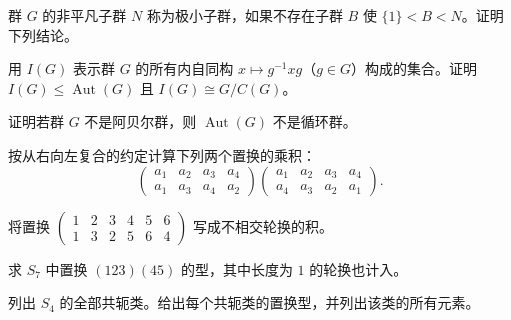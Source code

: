 \newpage
\noindent\begin{minipage}{\textwidth}
群 $G$ 的非平凡子群 $N$ 称为极小子群，如果不存在子群 $B$ 使 $\{1\}<B<N$。证明下列结论。
\end{minipage}\par\vfill
\noindent\begin{minipage}{\textwidth}
用 $I(G)$ 表示群 $G$ 的所有内自同构 $x\mapsto g^{-1}xg$（$g\in G$）构成的集合。证明 $I(G)\le\operatorname{Aut}(G)$ 且 $I(G)\cong G/C(G)$。
\end{minipage}\par\vfill
\noindent\begin{minipage}{\textwidth}
证明若群 $G$ 不是阿贝尔群，则 $\operatorname{Aut}(G)$ 不是循环群。
\end{minipage}\par\vfill
\newpage
\noindent\begin{minipage}{\textwidth}
按从右向左复合的约定计算下列两个置换的乘积：\[\begin{pmatrix}a_1&a_2&a_3&a_4\\a_1&a_3&a_4&a_2\end{pmatrix}\begin{pmatrix}a_1&a_2&a_3&a_4\\a_4&a_3&a_2&a_1\end{pmatrix}.\]
\end{minipage}\par\vfill
\noindent\begin{minipage}{\textwidth}
将置换 $\begin{pmatrix}1&2&3&4&5&6\\1&3&2&5&6&4\end{pmatrix}$ 写成不相交轮换的积。
\end{minipage}\par\vfill
\noindent\begin{minipage}{\textwidth}
求 $S_7$ 中置换 $(123)(45)$ 的型，其中长度为 $1$ 的轮换也计入。
\end{minipage}\par\vfill
\newpage
\noindent\begin{minipage}{\textwidth}
列出 $S_4$ 的全部共轭类。给出每个共轭类的置换型，并列出该类的所有元素。
\end{minipage}\par\vfill
